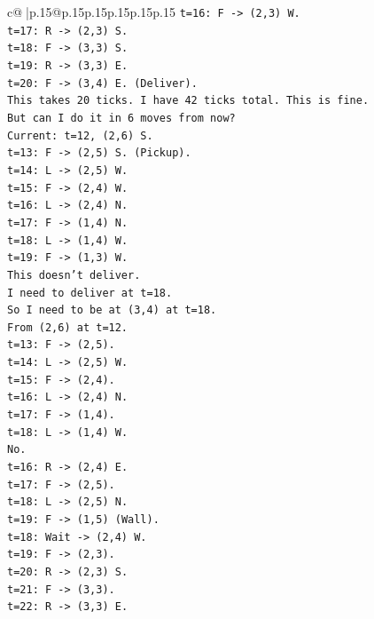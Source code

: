 \documentclass{article}
\begin{document}
{\begin{supertabular}{c@{$\;$}|p{.15\linewidth}@{}p{.15\linewidth}p{.15\linewidth}p{.15\linewidth}p{.15\linewidth}p{.15\linewidth}}
{{{\texttt{t=16: F {-}> (2,3) W.} \\
\texttt{t=17: R {-}> (2,3) S.} \\
\texttt{t=18: F {-}> (3,3) S.} \\
\texttt{t=19: R {-}> (3,3) E.} \\
\texttt{t=20: F {-}> (3,4) E. (Deliver).} \\
\texttt{This takes 20 ticks. I have 42 ticks total. This is fine.} \\
\texttt{But can I do it in 6 moves from now?} \\
\texttt{Current: t=12, (2,6) S.} \\
\texttt{t=13: F {-}> (2,5) S. (Pickup).} \\
\texttt{t=14: L {-}> (2,5) W.} \\
\texttt{t=15: F {-}> (2,4) W.} \\
\texttt{t=16: L {-}> (2,4) N.} \\
\texttt{t=17: F {-}> (1,4) N.} \\
\texttt{t=18: L {-}> (1,4) W.} \\
\texttt{t=19: F {-}> (1,3) W.} \\
\texttt{This doesn't deliver.} \\
\texttt{I need to deliver at t=18.} \\
\texttt{So I need to be at (3,4) at t=18.} \\
\texttt{From (2,6) at t=12.} \\
\texttt{t=13: F {-}> (2,5).} \\
\texttt{t=14: L {-}> (2,5) W.} \\
\texttt{t=15: F {-}> (2,4).} \\
\texttt{t=16: L {-}> (2,4) N.} \\
\texttt{t=17: F {-}> (1,4).} \\
\texttt{t=18: L {-}> (1,4) W.} \\
\texttt{No.} \\
\texttt{t=16: R {-}> (2,4) E.} \\
\texttt{t=17: F {-}> (2,5).} \\
\texttt{t=18: L {-}> (2,5) N.} \\
\texttt{t=19: F {-}> (1,5) (Wall).} \\
\texttt{t=18: Wait {-}> (2,4) W.} \\
\texttt{t=19: F {-}> (2,3).} \\
\texttt{t=20: R {-}> (2,3) S.} \\
\texttt{t=21: F {-}> (3,3).} \\
\texttt{t=22: R {-}> (3,3) E.} \\
}}}
\end{supertabular}}
\end{document}
